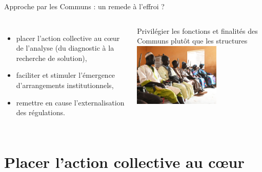 \documentclass[newPxFont]{beamer}
\begin{document}
\begin{frame}[c]{Approche par les Communs : un remede à l'effroi ?}
  \vspace{-1cm}
  \begin{columns}[onlytextwidth,T]
  \column{\dimexpr\linewidth-30mm-5mm}
    \begin{itemize}
      \item placer l'action collective au cœur de l'analyse (du diagnostic à la recherche de solution),
      \item faciliter et stimuler l'émergence d'arrangements institutionnels,
      \item remettre en cause l'externalisation des régulations.
    \end{itemize}
    Privilégier les fonctions et finalités des Communs plutôt que les structures
    \column{30mm}
    \vspace{2cm}
      \includegraphics[height=3cm]{img/groupe_diohine.JPG}
  \end{columns}
\end{frame}


\section{Placer l'action collective au cœur}
\end{document}
